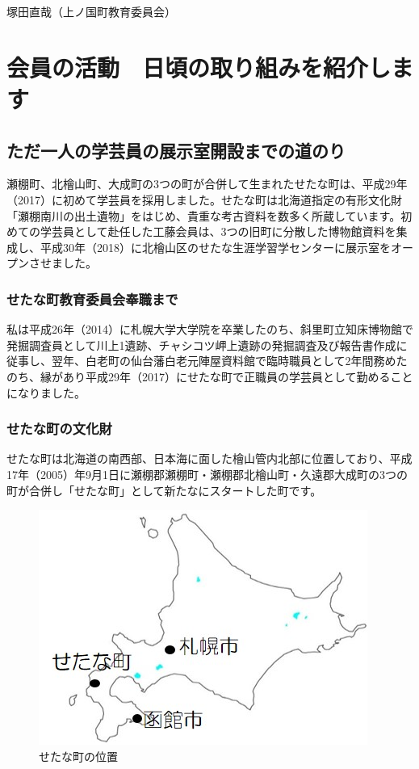 \documentclass[a4j,11pt,twocolumn,openany]{jsbook}
\begin{document}
\begin{flushright}
	塚田直哉（上ノ国町教育委員会）
\end{flushright}

\chapter{会員の活動　日頃の取り組みを紹介します}

\section{ただ一人の学芸員の展示室開設までの道のり}
瀬棚町、北檜山町、大成町の3つの町が合併して生まれたせたな町は、平成29年（2017）に初めて学芸員を採用しました。せたな町は北海道指定の有形文化財「瀬棚南川の出土遺物」をはじめ、貴重な考古資料を数多く所蔵しています。初めての学芸員として赴任した工藤会員は、3つの旧町に分散した博物館資料を集成し、平成30年（2018）に北檜山区のせたな生涯学習学センターに展示室をオープンさせました。

\subsection{せたな町教育委員会奉職まで}
私は平成26年（2014）に札幌大学大学院を卒業したのち、斜里町立知床博物館で発掘調査員として川上1遺跡、チャシコツ岬上遺跡の発掘調査及び報告書作成に従事し、翌年、白老町の仙台藩白老元陣屋資料館で臨時職員として2年間務めたのち、縁があり平成29年（2017）にせたな町で正職員の学芸員として勤めることになりました。

\subsection{せたな町の文化財}

せたな町は北海道の南西部、日本海に面した檜山管内北部に位置しており、平成17年（2005）年9月1日に瀬棚郡瀬棚町・瀬棚郡北檜山町・久遠郡大成町の3つの町が合併し「せたな町」として新たなにスタートした町です。

\begin{figure}[H]
	\centering
	\includegraphics[width=0.8\linewidth]{fig/04_Kudo/fig01.jpg}
	\caption{せたな町の位置}
	\label{}
\end{figure}
\end{document}
